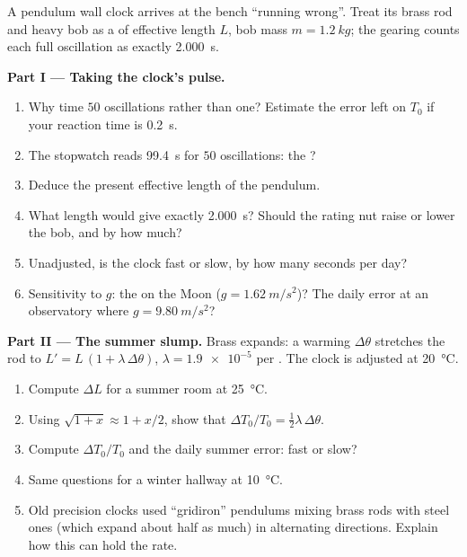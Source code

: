 \begin{problem}
\label{pb:g12:oscillators-and-time:1}
A pendulum wall clock arrives at the bench ``running wrong''. Treat
its brass rod and heavy bob as a  of effective length
$L$, bob mass $m = \qty{1.2}{kg}$; the gearing counts each full
oscillation as exactly \qty{2.000}{s}.

\medskip
\noindent\textbf{Part I --- Taking the clock's pulse.}
\begin{enumerate}
  \item Why time $50$ oscillations rather than one? Estimate the error
        left on $T_0$ if your reaction time is \qty{0.2}{s}.
  \item The stopwatch reads \qty{99.4}{s} for $50$ oscillations: the ?
  \item Deduce the present effective length of the pendulum.
  \item What length would give exactly \qty{2.000}{s}? Should the
        rating nut raise or lower the bob, and by how much?
  \item Unadjusted, is the clock fast or slow, by how many seconds per day?
  \item Sensitivity to $g$: the  on the Moon
        ($g = \qty{1.62}{m/s^2}$)? The daily error at an observatory
        where $g = \qty{9.80}{m/s^2}$?
\end{enumerate}

\medskip
\noindent\textbf{Part II --- The summer slump.} Brass expands: a
warming $\Delta\theta$ stretches the rod to $L' = L\,(1 + \lambda\,
\Delta\theta)$, $\lambda = \num{1.9e-5}$ per . The clock is
adjusted at \qty{20}{\celsius}.
\begin{enumerate}[resume]
  \item Compute $\Delta L$ for a summer room at \qty{25}{\celsius}.
  \item Using $\sqrt{1+x} \approx 1 + x/2$, show that
        $\Delta T_0 / T_0 = \tfrac12 \lambda\, \Delta\theta$.
  \item Compute $\Delta T_0/T_0$ and the daily summer error: fast or slow?
  \item Same questions for a winter hallway at \qty{10}{\celsius}.
  \item Old precision clocks used ``gridiron'' pendulums mixing brass
        rods with steel ones (which expand about half as much) in
        alternating directions. Explain how this can hold the rate.
\end{enumerate}


\end{problem}
